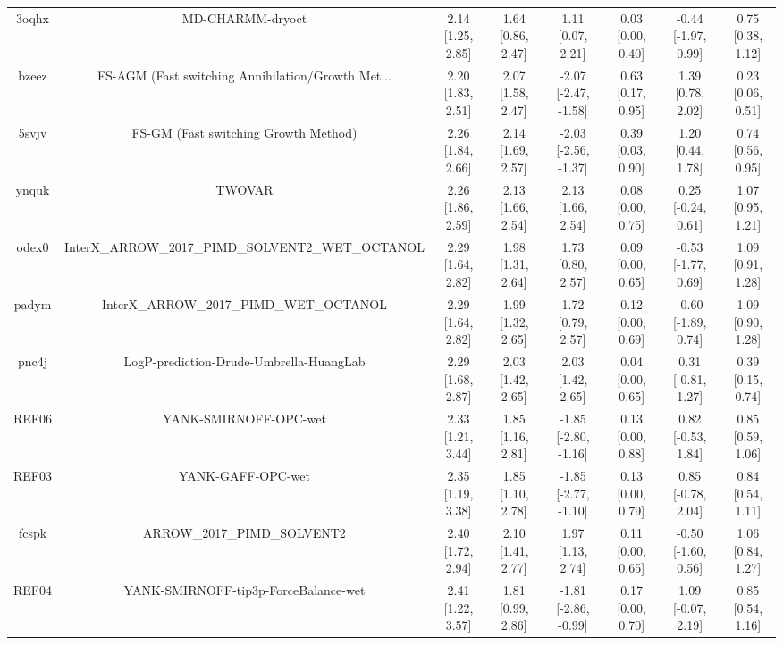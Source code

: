 \documentclass{article}
\begin{document}
\begin{center}
\begin{longtable}{|cccccccc|}
 3oqhx &                                   MD-CHARMM-dryoct &  2.14 [1.25, 2.85] &  1.64 [0.86, 2.47] &     1.11 [0.07, 2.21] &  0.03 [0.00, 0.40] &  -0.44 [-1.97, 0.99] &     0.75 [0.38, 1.12] \\
 bzeez &  FS-AGM (Fast switching Annihilation/Growth Met... &  2.20 [1.83, 2.51] &  2.07 [1.58, 2.47] &  -2.07 [-2.47, -1.58] &  0.63 [0.17, 0.95] &    1.39 [0.78, 2.02] &     0.23 [0.06, 0.51] \\
 5svjv &               FS-GM (Fast switching Growth Method) &  2.26 [1.84, 2.66] &  2.14 [1.69, 2.57] &  -2.03 [-2.56, -1.37] &  0.39 [0.03, 0.90] &    1.20 [0.44, 1.78] &     0.74 [0.56, 0.95] \\
 ynquk &                                             TWOVAR &  2.26 [1.86, 2.59] &  2.13 [1.66, 2.54] &     2.13 [1.66, 2.54] &  0.08 [0.00, 0.75] &   0.25 [-0.24, 0.61] &     1.07 [0.95, 1.21] \\
 odex0 &  InterX\_ARROW\_2017\_PIMD\_SOLVENT2\_WET\_OCTANOL &  2.29 [1.64, 2.82] &  1.98 [1.31, 2.64] &     1.73 [0.80, 2.57] &  0.09 [0.00, 0.65] &  -0.53 [-1.77, 0.69] &     1.09 [0.91, 1.28] \\
 padym &            InterX\_ARROW\_2017\_PIMD\_WET\_OCTANOL &  2.29 [1.64, 2.82] &  1.99 [1.32, 2.65] &     1.72 [0.79, 2.57] &  0.12 [0.00, 0.69] &  -0.60 [-1.89, 0.74] &     1.09 [0.90, 1.28] \\
 pnc4j &            LogP-prediction-Drude-Umbrella-HuangLab &  2.29 [1.68, 2.87] &  2.03 [1.42, 2.65] &     2.03 [1.42, 2.65] &  0.04 [0.00, 0.65] &   0.31 [-0.81, 1.27] &     0.39 [0.15, 0.74] \\
 REF06 &                              YANK-SMIRNOFF-OPC-wet &  2.33 [1.21, 3.44] &  1.85 [1.16, 2.81] &  -1.85 [-2.80, -1.16] &  0.13 [0.00, 0.88] &   0.82 [-0.53, 1.84] &     0.85 [0.59, 1.06] \\
 REF03 &                                  YANK-GAFF-OPC-wet &  2.35 [1.19, 3.38] &  1.85 [1.10, 2.78] &  -1.85 [-2.77, -1.10] &  0.13 [0.00, 0.79] &   0.85 [-0.78, 2.04] &     0.84 [0.54, 1.11] \\
 fcspk &                        ARROW\_2017\_PIMD\_SOLVENT2 &  2.40 [1.72, 2.94] &  2.10 [1.41, 2.77] &     1.97 [1.13, 2.74] &  0.11 [0.00, 0.65] &  -0.50 [-1.60, 0.56] &     1.06 [0.84, 1.27] \\
 REF04 &               YANK-SMIRNOFF-tip3p-ForceBalance-wet &  2.41 [1.22, 3.57] &  1.81 [0.99, 2.86] &  -1.81 [-2.86, -0.99] &  0.17 [0.00, 0.70] &   1.09 [-0.07, 2.19] &     0.85 [0.54, 1.16] \\

\end{longtable}
\end{center}
\end{document}
